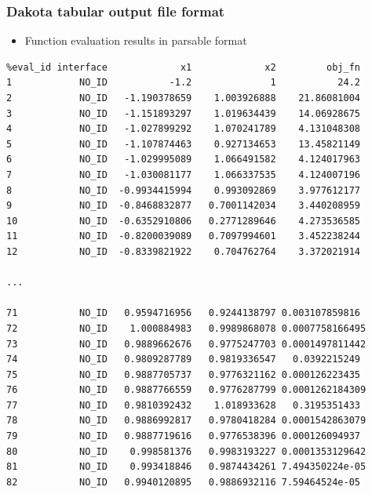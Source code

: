 \documentclass[t]{beamer}
\begin{document}
\begin{frame}[fragile]
  \frametitle{Dakota tabular output file format}
  \begin{itemize}
    \item Function evaluation results in parsable format
  \end{itemize}
  \begin{tiny}\begin{lstlisting}
%eval_id interface             x1             x2         obj_fn
1            NO_ID           -1.2              1           24.2
2            NO_ID   -1.190378659    1.003926888    21.86081004
3            NO_ID   -1.151893297    1.019634439    14.06928675
4            NO_ID   -1.027899292    1.070241789    4.131048308
5            NO_ID   -1.107874463    0.927134653    13.45821149
6            NO_ID   -1.029995089    1.066491582    4.124017963
7            NO_ID   -1.030081177    1.066337535    4.124007196
8            NO_ID  -0.9934415994    0.993092869    3.977612177
9            NO_ID  -0.8468832877   0.7001142034    3.440208959
10           NO_ID  -0.6352910806   0.2771289646    4.273536585
11           NO_ID  -0.8200039089   0.7097994601    3.452238244
12           NO_ID  -0.8339821922    0.704762764    3.372021914

...

71           NO_ID   0.9594716956   0.9244138797 0.003107859816
72           NO_ID    1.000884983   0.9989868078 0.0007758166495
73           NO_ID   0.9889662676   0.9775247703 0.0001497811442
74           NO_ID   0.9809287789   0.9819336547   0.0392215249
75           NO_ID   0.9887705737   0.9776321162 0.000126223435
76           NO_ID   0.9887766559   0.9776287799 0.0001262184309
77           NO_ID   0.9810392432    1.018933628   0.3195351433
78           NO_ID   0.9886992817   0.9780418284 0.0001542863079
79           NO_ID   0.9887719616   0.9776538396 0.000126094937
80           NO_ID    0.998581376   0.9983193227 0.0001353129642
81           NO_ID    0.993418846   0.9874434261 7.494350224e-05
82           NO_ID   0.9940120895   0.9886932116 7.59464524e-05\end{lstlisting}\end{tiny}
\end{frame}

\end{document}
